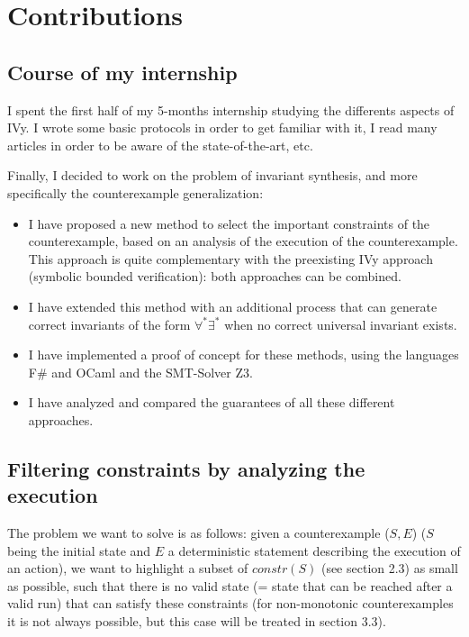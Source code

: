 \documentclass[11pt,a4paper,oldfontcommands,openany]{memoir}
\begin{document}
\chapter{Contributions}

    \section{Course of my internship}

    I spent the first half of my 5-months internship studying the differents aspects of IVy. I wrote some basic protocols in order to get
    familiar with it, I read many articles in order to be aware of the state-of-the-art, etc.

    Finally, I decided to work on the problem of invariant synthesis, and more specifically the counterexample generalization:
    \begin{itemize}
        \item I have proposed a new method to select the important constraints of the counterexample, based on an analysis of the execution of the counterexample.
        This approach is quite complementary with the preexisting IVy approach (symbolic bounded verification): both approaches can be combined. 
        \item I have extended this method with an additional process that can generate correct invariants of the form \(\forall^*\exists^*\)
        when no correct universal invariant exists.
        \item I have implemented a proof of concept for these methods, using the languages F\# and OCaml and the SMT-Solver Z3\cite{z3ref}.        
        \item I have analyzed and compared the guarantees of all these different approaches.
    \end{itemize}

    \section{Filtering constraints by analyzing the execution}

    The problem we want to solve is as follows: given a counterexample (\(S,E\)) (\(S\) being the initial state and \(E\) a deterministic statement describing the execution of an action),
    we want to highlight a subset of \(constr(S)\) (see section 2.3) as small as possible, such that there is no valid state (= state that can be reached after a valid run) that can satisfy these constraints
    (for non-monotonic counterexamples it is not always possible, but this case will be treated in section 3.3).
\end{document}
